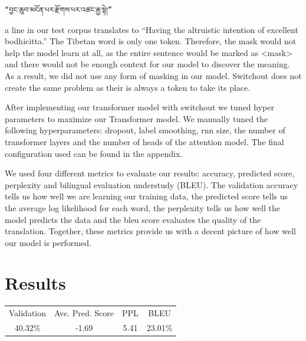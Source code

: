 \documentclass[letterpaper, 12 pt, conference]{ieeeconf}  %
\begin{document}
\begin{verbatim}
“བྱང་ཆུབ་མངོན་པར་རྫོགས་པར་འཚང་རྒྱ་སྟེ།” 
\end{verbatim}
a line in our test corpus translates to “Having the altruistic intention of excellent bodhicitta.” The Tibetan word is only one token. Therefore, the mask would not help the model learn at all, as the entire sentence would be marked as <mask> and there would not be enough context for our model to discover the meaning. As a result, we did not use any form of masking in our model. Switchout does not create the same problem as their is always a token to take its place. \par
After implementing our transformer model with switchout we tuned hyper parameters to maximize our Transformer model. We manually tuned the following hyperparameters: dropout, label smoothing, rnn size, the number of transformer layers and the number of heads of the attention model. The final configuration used can be found in the appendix. \par
We used four different metrics to evaluate our results: accuracy, predicted score, perplexity and bilingual evaluation understudy (BLEU). The validation accuracy tells us how well we are learning our training data, the predicted score tells us the average log likelihood for each word, the perplexity tells us how well the model predicts the data and the bleu score evaluates the quality of the translation. Together, these metrics provide us with a decent picture of how well our model is performed. 

\section{Results}
\begin{tabular}{ |c| c| c| c| }
 Validation & Ave. Pred. Score & PPL & BLEU \\ 
 40.32\% & -1.69 & 5.41 & 23.01\% \\

\end{tabular}\\
\end{document}
